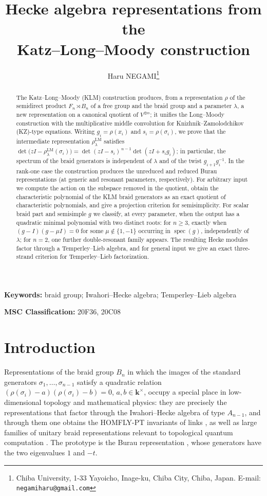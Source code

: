 \documentclass[11pt]{article}
\title{Hecke algebra representations from the\\ Katz--Long--Moody construction}
\author{Haru NEGAMI\thanks{Chiba University,
1-33 Yayoicho, Inage-ku, Chiba City, Chiba, Japan.
E-mail: \texttt{negamiharu@gmail.com}}}
\date{}
\theoremstyle{definition}
\theoremstyle{remark}
\newcommand{\spec}{\operatorname{spec}}
\newcommand{\kk}{\boldsymbol{k}}
\newcommand{\rLMl}{\rho^{\mathrm{LM}}_{\lambda}}
\begin{document}
\maketitle

\begin{abstract}
The Katz--Long--Moody (KLM) construction produces, from a representation
$\rho$ of the semidirect product $F_n \rtimes B_n$ of a free group and
the braid group and a parameter $\lambda$, a new representation on a
canonical quotient of $V^{\oplus n}$; it unifies the Long--Moody
construction with the multiplicative middle convolution for
Knizhnik--Zamolodchikov (KZ)-type equations. Writing $g_i = \rho(x_i)$ and $s_i = \rho(\sigma_i)$, we
prove that the intermediate representation $\rLMl$ satisfies
$\det\bigl(z I - \rLMl(\sigma_i)\bigr)
= \det(z I - s_i)^{\,n-1}\det(z I + s_i g_i)$; in particular, the
spectrum of the braid generators is independent of $\lambda$ and of the
twist $g_{i+1} g_i^{-1}$. In the rank-one case the construction produces
the unreduced and reduced Burau representations (at generic and
resonant parameters, respectively). For arbitrary input we compute the action on
the subspace removed in the quotient, obtain the characteristic
polynomial of the KLM braid generators as an exact quotient of
characteristic polynomials, and give a projection criterion for
semisimplicity. For scalar braid part and semisimple $g$ we classify,
at every parameter, when the output has a quadratic minimal polynomial
with two distinct roots: for $n \geq 3$, exactly when
$(g - I)(g - \mu I) = 0$ for some $\mu \notin \{1, -1\}$ occurring in
$\spec(g)$, independently of $\lambda$; for $n = 2$, one further
double-resonant family appears. The resulting Hecke
modules factor through a Temperley--Lieb algebra, and for general input
we give an exact three-strand criterion for Temperley--Lieb
factorization.
\end{abstract}

\noindent\textbf{Keywords:} braid group; Iwahori--Hecke algebra;
Temperley--Lieb algebra

\smallskip
\noindent\textbf{MSC Classification:} 20F36, 20C08

\section{Introduction}\label{sec:intro}

Representations of the braid group $B_n$ in which the images of the standard
generators $\sigma_1, \dots, \sigma_{n-1}$ satisfy a quadratic relation
$(\rho(\sigma_i) - a)(\rho(\sigma_i) - b) = 0$, $a, b \in \kk^{\times}$,
occupy a special place in low-dimensional topology and mathematical physics:
they are precisely the representations that factor through the
Iwahori--Hecke algebra of type $A_{n-1}$, and through them one obtains the
HOMFLY-PT invariants of links \cite{Jones87}, as well as large families of
unitary braid representations relevant to topological quantum computation
\cite{NSSFD08, DRW16}. The prototype is the Burau representation
\cite{Burau36}, whose generators have the two eigenvalues $1$ and $-t$.
\end{document}
